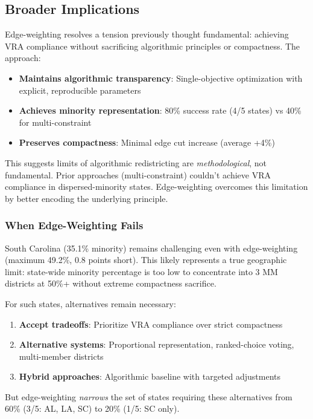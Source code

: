 \subsection{Broader Implications}

Edge-weighting resolves a tension previously thought fundamental: achieving VRA compliance without sacrificing algorithmic principles or compactness. The approach:

\begin{itemize}
\item \textbf{Maintains algorithmic transparency}: Single-objective optimization with explicit, reproducible parameters
\item \textbf{Achieves minority representation}: 80\% success rate (4/5 states) vs 40\% for multi-constraint
\item \textbf{Preserves compactness}: Minimal edge cut increase (average +4\%)
\end{itemize}

This suggests limits of algorithmic redistricting are \textit{methodological}, not fundamental. Prior approaches (multi-constraint) couldn't achieve VRA compliance in dispersed-minority states. Edge-weighting overcomes this limitation by better encoding the underlying principle.

\subsubsection{When Edge-Weighting Fails}

South Carolina (35.1\% minority) remains challenging even with edge-weighting (maximum 49.2\%, 0.8 points short). This likely represents a true geographic limit: state-wide minority percentage is too low to concentrate into 3 MM districts at 50\%+ without extreme compactness sacrifice.

For such states, alternatives remain necessary:
\begin{enumerate}
\item \textbf{Accept tradeoffs}: Prioritize VRA compliance over strict compactness
\item \textbf{Alternative systems}: Proportional representation, ranked-choice voting, multi-member districts
\item \textbf{Hybrid approaches}: Algorithmic baseline with targeted adjustments
\end{enumerate}

But edge-weighting \textit{narrows} the set of states requiring these alternatives from 60\% (3/5: AL, LA, SC) to 20\% (1/5: SC only).
